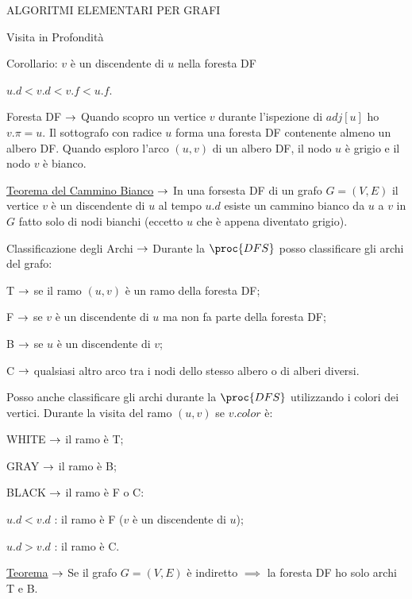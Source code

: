 \documentclass[8pt]{extarticle}
\begin{document}
\begin{formulario}
\begin{myParagraph}{ALGORITMI ELEMENTARI PER GRAFI}
\begin{subParagraph}{Visita in Profondità}
\begin{Descr}
\begin{itemize}
				\end{itemize} 
				\begin{Descr} 
					\item[Corollario:] $v$ è un discendente di $u$ nella foresta DF \SSE \begin{tcenter}$u.d<v.d<v.f<u.f$.\end{tcenter}
				\end{Descr}
				\item[Foresta DF] $\rightarrow$ Quando scopro un vertice $v$ durante l'ispezione di $adj[u]$ ho $v.\pi=u$. Il sottografo con radice $u$ forma una foresta  DF contenente almeno un albero DF. Quando esploro l'arco $(u,v)$ di un albero DF, il nodo $u$ è grigio e il nodo $v$ è bianco.
				\item[\underline{Teorema del Cammino Bianco}] $\rightarrow$ In una forsesta DF di un grafo $G=(V,E)$ il vertice $v$ è un discendente di $u$ \SSE al tempo $u.d$ esiste un cammino bianco da $u$ a $v$ in $G$ fatto solo di nodi bianchi (eccetto $u$ che è appena diventato grigio). 
				\item[Classificazione degli Archi] $\rightarrow$ Durante la $\proc{DFS}$ posso classificare gli archi del grafo:
				\begin{Descr} 
					\item[T] $\rightarrow$ se il ramo $(u,v)$ è un ramo della foresta DF;
					\item[F] $\rightarrow$ se $v$ è un discendente di $u$ ma non fa parte della foresta DF;
					\item[B] $\rightarrow$ se $u$ è un discendente di $v$;
					\item[C] $\rightarrow$ qualsiasi altro arco tra i nodi dello stesso albero o di alberi diversi.
				\end{Descr}
Posso anche classificare gli archi durante la $\proc{DFS}$ utilizzando i colori dei vertici. Durante la visita del ramo $(u,v)$ se $v.color$ è:
				\begin{Descr} 
					\item[WHITE] $\rightarrow$ il ramo è T;
					\item[GRAY] $\rightarrow$ il ramo è B;
					\item[BLACK] $\rightarrow$ il ramo è F o C:
					\begin{Descr} 
						\item[$u.d<v.d$]: il ramo è F ($v$ è un discendente di $u$);
						\item[$u.d>v.d$]: il ramo è C.
					\end{Descr}
				\end{Descr}
				\item[\underline{Teorema}] $\rightarrow$ Se il grafo $G=(V,E)$ è indiretto $\implies$ la foresta DF ho solo archi T e B.

\end{Descr}
\end{subParagraph}
\end{myParagraph}
\end{formulario}
\end{document}

